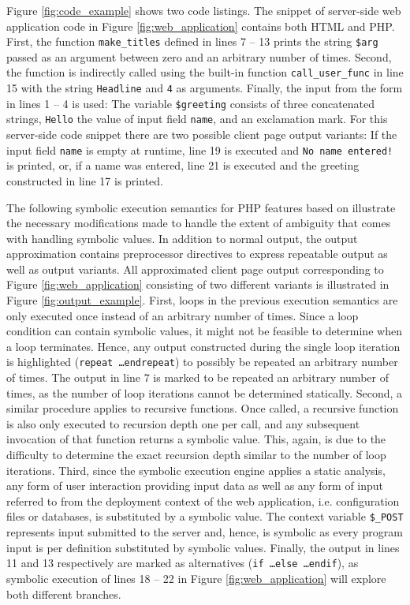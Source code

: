 \documentclass[sigconf]{acmart}
\begin{document}
Figure \ref{fig:code_example} shows two code listings. The snippet of server-side web
application code in Figure \ref{fig:web_application} contains both HTML and PHP. First, the
function \texttt{make\_titles} defined in lines 7 – 13 prints the string
\texttt{\$arg} passed as an argument between zero and an arbitrary number of
times. Second, the function is indirectly called using the built-in function
\texttt{call\_user\_func} in line 15 with the string \texttt{Headline} and
\texttt{4} as arguments.  Finally, the input from the form in lines 1 – 4 is
used: The variable \texttt{\$greeting} consists of three concatenated strings,
\texttt{Hello} the value of input field \texttt{name}, and an exclamation mark.
For this server-side code snippet there are two possible client page output
variants: If the input field \texttt{name} is empty at runtime, line 19 is
executed and \texttt{No name entered!} is printed, or, if a name was entered,
line 21 is executed and the greeting constructed in line 17 is printed.



The following symbolic execution semantics for PHP features  based on \cite{Nguyen:2014:BCG:2635868.2635928}
illustrate the necessary modifications made to handle the extent of ambiguity
that comes with handling symbolic values. In addition to normal output, the
output approximation contains preprocessor directives to express
repeatable output as well as output variants. All approximated client page
output corresponding to Figure \ref{fig:web_application} consisting of two different variants
is illustrated in Figure \ref{fig:output_example}.
First, loops in the previous execution semantics are only executed once instead
of an arbitrary number of times. Since a loop condition can contain symbolic
values, it might not be feasible to determine when a loop terminates. Hence,
any output constructed during the single loop iteration is highlighted
(\texttt{repeat \ldots  endrepeat}) to possibly be repeated an arbitrary number
of times. The output in line 7 is marked to be repeated an arbitrary number of times, as the number
of loop iterations cannot be determined statically. Second, a similar procedure
applies to recursive functions. Once called, a recursive function is  also only
executed to recursion depth one per call, and any subsequent invocation of that
function returns a symbolic value. This, again, is due to the difficulty to
determine the exact recursion depth similar to the number of loop iterations.
Third, since the symbolic execution engine applies a static analysis, any form
of user interaction providing input data as well as any form of input referred
to from the deployment context of the web application, i.e. configuration files
or databases, is substituted by a symbolic value. The context variable
\texttt{\$\_POST} represents input submitted to the server and, hence, is
symbolic as every program input is per definition substituted by symbolic values. Finally, the
output in lines 11 and 13 respectively are marked as alternatives
(\texttt{if \ldots else \ldots endif}), as symbolic execution of lines 18 – 22
in Figure \ref{fig:web_application} will explore both different branches.
\end{document}
